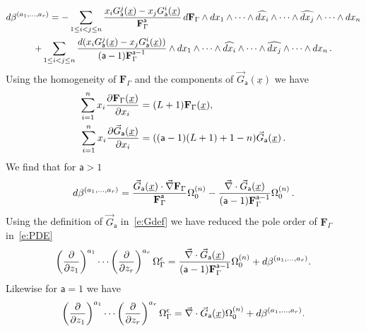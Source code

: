 \documentclass[a4paper,12pt]{article}
\numberwithin{equation}{section}
\numberwithin{figure}{section}
\begin{document}
\begin{multline}
  d\beta^{(a_1,\dots,a_r)}=-  \sum_{1\leq i<j\leq n} {x_i
    G_{\mathsf{a}}^j  (\underline x)-x_j
   G_{\mathsf{a}}^i(\underline x)\over
   \textbf{F}_\Gamma^{\mathsf{a}}}\, d \textbf{F}_\Gamma\wedge
 dx_1\wedge \cdots \wedge \widehat{dx_i}\wedge \cdots \wedge\widehat{dx_j}\wedge
 \cdots \wedge dx_n \cr
+  \sum_{1\leq i<j\leq n} {d(x_i
    G_{\mathsf{a}}^j  (\underline x)-x_j
   G_{\mathsf{a}}^i(\underline x))\over
    (\mathsf{a}-1)\textbf{F}_\Gamma^{\mathsf{a}-1}}\wedge
 dx_1\wedge \cdots \wedge \widehat{dx_i}\wedge \cdots \wedge\widehat{dx_j}\wedge
  \cdots \wedge dx_n  \, .
\end{multline}
Using the homogeneity of $\mathbf{F}_\Gamma$ and the
components of $\vec G_{\mathsf{a}}(\underline x)$ we have
\begin{align}
  \sum_{i=1}^n x_i {\partial\mathbf{F}_\Gamma (\underline x)\over \partial x_i}&=
                                                                  (L+1) \mathbf{F}_\Gamma (\underline x),\\
   \sum_{i=1}^n x_i {\partial\vec G_{\mathsf{a}}(\underline x)\over \partial x_i}&=
                                                                  ((\mathsf{a}-1)(L+1)+1-n) \vec G_{\mathsf{a}}(\underline x) \,.
\end{align}
We find that for $\mathsf{a}>1$
   \begin{equation}
     d\beta^{(a_1,\dots,a_r)}= {  \vec  G_{\mathsf{a}}
     (\underline x)
\cdot    \vec \nabla\textbf{F}_\Gamma\over
     \textbf{F}_\Gamma^{\mathsf{a}}}\Omega_0^{(n)}-{
\vec\nabla \cdot \vec G_{\mathsf{a}}
     (\underline x)
    \over
    (\mathsf{a}-1)\textbf{F}_\Gamma^{\mathsf{a}-1}}
  \Omega_0^{(n)} \,.
\end{equation}
Using the definition of $\vec  G_{\mathsf{a}}$ in~\eqref{e:Gdef} we
have reduced the pole order  of $ \textbf{F}_\Gamma$ in~\eqref{e:PDE} 
\begin{equation}
\left(\partial\over \partial z_1\right)^{a_1}\cdots\left(\partial
  \over\partial z_r\right)^{a_r} \Omega_\Gamma^\epsilon={
\vec\nabla \cdot \vec G_{\mathsf{a}}
     (\underline x)
    \over
    (\mathsf{a}-1)\textbf{F}_\Gamma^{\mathsf{a}-1}}
  \Omega_0^{(n)}+d\beta^{(a_1,\dots,a_r)}.
\end{equation}
Likewise for $\mathsf{a}=1$ we have
\begin{equation}
    \left(\partial\over \partial z_1\right)^{a_1}\cdots\left(\partial
  \over\partial z_r\right)^{a_r} \Omega_\Gamma^\epsilon=
\vec\nabla \cdot \vec G_{\mathsf{a}}
     (\underline x)
  \Omega_0^{(n)}+d\beta^{(a_1,\dots,a_r)}.
\end{equation}
\end{document}
